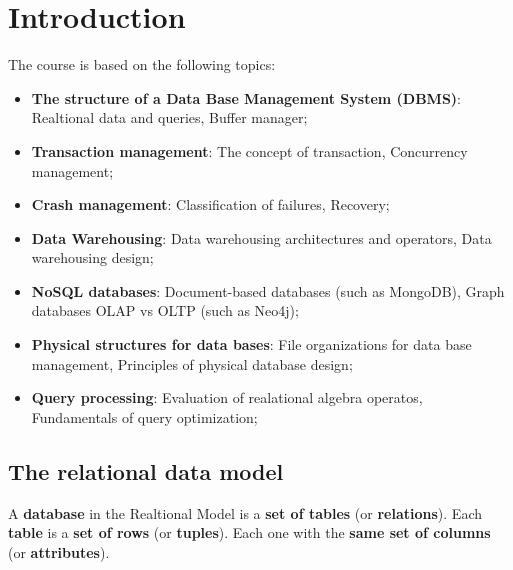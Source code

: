 \section{Introduction}
\setcounter{page}{1}

The course is based on the following topics:
\begin{itemize}
    \item \textbf{The structure of a Data Base Management System (DBMS)}: Realtional data and queries, Buffer manager;
    \item \textbf{Transaction management}: The concept of transaction, Concurrency management;
    \item \textbf{Crash management}: Classification of failures, Recovery;
    \item \textbf{Data Warehousing}: Data warehousing architectures and operators, Data warehousing design;
    \item \textbf{NoSQL databases}: Document-based databases (such as MongoDB), Graph databases OLAP vs OLTP (such as Neo4j);
    \item \textbf{Physical structures for data bases}: File organizations for data base management, Principles of physical database design;
    \item \textbf{Query processing}: Evaluation of realational algebra operatos, Fundamentals of query optimization;
\end{itemize}

\subsection{The relational data model}
A \textbf{database} in the Realtional Model is a \textbf{set of tables} (or \textbf{relations}).
Each \textbf{table} is a \textbf{set of rows} (or \textbf{tuples}). Each one with the \textbf{same set of columns} (or \textbf{attributes}).

